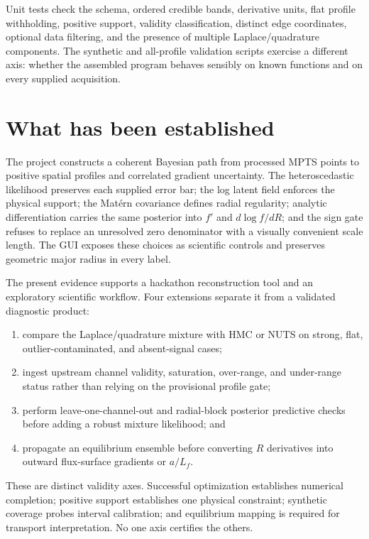 \documentclass[10pt,twocolumn]{article}
\begin{document}
Unit tests check the schema, ordered credible bands, derivative units, flat
profile withholding, positive support, validity classification, distinct edge
coordinates, optional data filtering, and the presence of multiple
Laplace/quadrature components.  The synthetic and all-profile validation
scripts exercise a different axis: whether the assembled program behaves
sensibly on known functions and on every supplied acquisition.

\section{What has been established}

The project constructs a coherent Bayesian path from processed MPTS points to
positive spatial profiles and correlated gradient uncertainty.  The
heteroscedastic likelihood preserves each supplied error bar; the log latent
field enforces the physical support; the Mat\'ern covariance defines radial
regularity; analytic differentiation carries the same posterior into $f'$ and
$d\log f/dR$; and the sign gate refuses to replace an unresolved zero
denominator with a visually convenient scale length.  The GUI exposes these
choices as scientific controls and preserves geometric major radius in every
label.

The present evidence supports a hackathon reconstruction tool and an
exploratory scientific workflow.  Four extensions separate it from a validated
diagnostic product:
\begin{enumerate}
\item compare the Laplace/quadrature mixture with HMC or NUTS on strong, flat,
outlier-contaminated, and absent-signal cases;
\item ingest upstream channel validity, saturation, over-range, and under-range
status rather than relying on the provisional profile gate;
\item perform leave-one-channel-out and radial-block posterior predictive
checks before adding a robust mixture likelihood; and
\item propagate an equilibrium ensemble before converting $R$ derivatives into
outward flux-surface gradients or $a/L_f$.
\end{enumerate}
These are distinct validity axes.  Successful optimization establishes
numerical completion; positive support establishes one physical constraint;
synthetic coverage probes interval calibration; and equilibrium mapping is
required for transport interpretation.  No one axis certifies the others.
\end{document}
